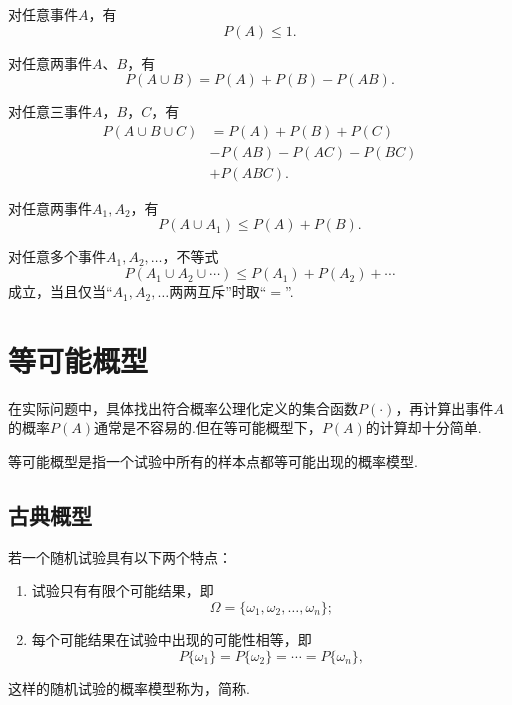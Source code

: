 \begin{property}
对任意事件\(A\)，有\begin{equation}
P(A) \leq 1.
\end{equation}
\end{property}

\begin{theorem}[概率的加法]
对任意两事件\(A\)、\(B\)，有\begin{equation}
P(A \cup B) = P(A) + P(B) - P(AB).
\end{equation}
\end{theorem}

\begin{corollary}
对任意三事件\(A\)，\(B\)，\(C\)，有\begin{equation}
\begin{aligned}
P(A \cup B \cup C)
&= P(A) + P(B) + P(C) \\
&- P(AB) - P(AC) - P(BC) \\
&+ P(ABC).
\end{aligned}
\end{equation}
\end{corollary}

\begin{theorem}
对任意两事件\(A_1,A_2\)，有\begin{equation}
P(A \cup A_1) \leq P(A) + P(B).
\end{equation}
\end{theorem}

\begin{corollary}[布尔不等式]
对任意多个事件\(A_1,A_2,\dotsc\)，不等式\begin{equation}\label{equation:概率论基础.布尔不等式}
P(A_1 \cup A_2 \cup \dotsb)
\leq
P(A_1) + P(A_2) + \dotsb
\end{equation}
成立，当且仅当“\(A_1,A_2,\dotsc\)两两互斥”时取“\(=\)”.
\end{corollary}

\section{等可能概型}
在实际问题中，具体找出符合概率公理化定义的集合函数\(P(\cdot)\)，再计算出事件\(A\)的概率\(P(A)\)通常是不容易的.但在等可能概型下，\(P(A)\)的计算却十分简单.

等可能概型是指一个试验中所有的样本点都等可能出现的概率模型.
\subsection{古典概型}
\begin{definition}
若一个随机试验具有以下两个特点：
\begin{enumerate}
\item 试验只有有限个可能结果，即\[
\Omega = \{\omega_1, \omega_2, \dotsc, \omega_n\};
\]

\item 每个可能结果在试验中出现的可能性相等，即\[
P\{\omega_1\} = P\{\omega_2\} = \dotsb = P\{\omega_n\},
\]
\end{enumerate}
这样的随机试验的概率模型称为，简称.
\end{definition}

